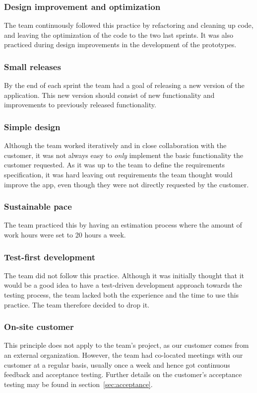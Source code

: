 \subsubsection{Design improvement and optimization}
The team continuously followed this practice by refactoring and cleaning up code, and leaving the optimization of the code to the two last sprints. It was also practiced during design improvements in the development of the prototypes.
 
\subsubsection{Small releases}
By the end of each sprint the team had a goal of releasing a new version of the application. This new version should consist of new functionality and improvements to previously released functionality.

\subsubsection{Simple design}
Although the team worked iteratively and in close collaboration with the customer, it was not always easy to \emph{only} implement the basic functionality the customer requested. As it was up to the team to define the requirements specification, it was hard leaving out requirements the team thought would improve the app, even though they were not directly requested by the customer.

\subsubsection{Sustainable pace}
The team practiced this by having an estimation process where the amount of work hours were set to 20 hours a week.

\subsubsection{Test-first development}
The team did not follow this practice. Although it was initially thought that it would be a good idea to have a test-driven development approach towards the testing process, the team lacked both the experience and the time to use this practice. The team therefore decided to drop it.

\subsubsection{On-site customer}
This principle does not apply to the team's project, as our customer comes from an external organization. However, the team had co-located meetings with our customer at a regular basis, usually once a week and hence got continuous feedback and acceptance testing. Further details on the customer's acceptance testing may be found in section~\ref{sec:acceptance}.
